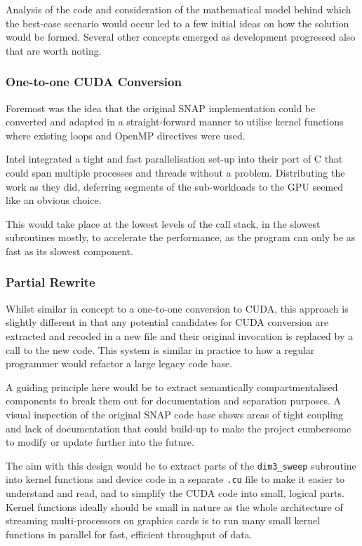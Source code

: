 \documentclass[conference]{IEEEtran}
\begin{document}
Analysis of the code and consideration of the mathematical model behind which the best-case scenario would occur led to a few initial ideas on how the solution would be formed. Several other concepts emerged as development progressed also that are worth noting.


\subsubsection{One-to-one CUDA Conversion}

Foremost was the idea that the original SNAP implementation could be converted and adapted in a straight-forward manner to utilise kernel functions where existing loops and OpenMP directives were used.

Intel integrated a tight and fast parallelisation set-up into their port of C that could span multiple processes and threads without a problem. Distributing the work as they did, deferring segments of the sub-workloads to the GPU seemed like an obvious choice.

This would take place at the lowest levels of the call stack, in the slowest subroutines mostly, to accelerate the performance, as the program can only be as fast as its slowest component.


\subsubsection{Partial Rewrite}

Whilst similar in concept to a one-to-one conversion to CUDA, this approach is slightly different in that any potential candidates for CUDA conversion are extracted and recoded in a new file and their original invocation is replaced by a call to the new code. This system is similar in practice to how a regular programmer would refactor a large legacy code base.

A guiding principle here would be to extract semantically compartmentalised components to break them out for documentation and separation purposes. A visual inspection of the original SNAP code base shows areas of tight coupling and lack of documentation that could build-up to make the project cumbersome to modify or update further into the future.

The aim with this design would be to extract parts of the \texttt{dim3\_sweep} subroutine into kernel functions and device code in a separate \texttt{.cu} file to make it easier to understand and read, and to simplify the CUDA code into small, logical parts. Kernel functions ideally should be small in nature as the whole architecture of streaming multi-processors on graphics cards is to run many small kernel functions in parallel for fast, efficient throughput of data.
\end{document}
